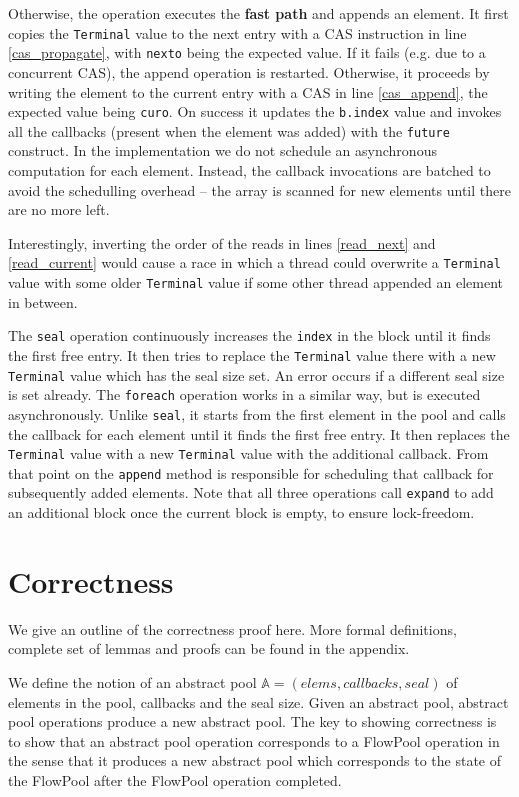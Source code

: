 \documentclass[runningheads,a4paper]{llncs}
\begin{document}
Otherwise, the operation executes the \textbf{fast path} and appends
an element.
It first copies the \verb=Terminal= value to the next entry with a CAS
instruction in line \ref{cas_propagate}, with \verb=nexto= being the
expected value. If it fails (e.g. due to a concurrent CAS), the append
operation is restarted.
Otherwise, it proceeds by writing the element to the current entry with
a CAS in line \ref{cas_append}, the expected value being
\verb=curo=.
On success it updates the \verb=b.index= value and invokes all
the callbacks (present when the element was added) with
the \verb=future= construct.
In the implementation we do not schedule an asynchronous
computation for each element.
Instead, the callback invocations are batched to avoid the schedulling overhead
-- the array is scanned for new elements
until there are no more left.

Interestingly, inverting the order of the reads in lines
\ref{read_next} and \ref{read_current} would cause a race in which a
thread could overwrite a \verb=Terminal= value with some older
\verb=Terminal= value if some other thread appended an element in between.

The \verb=seal= operation continuously increases the \verb=index= in the block
until it finds the first free entry. It then tries to replace the \verb=Terminal=
value there with a new \verb=Terminal= value which has the seal size set.
An error occurs if a different seal size is set already. The \verb=foreach=
operation works in a similar way, but is executed asynchronously. Unlike
\verb=seal=, it starts from the first element in the pool and calls the
callback for each element until it finds the first free entry.
It then replaces the \verb=Terminal= value with a new \verb=Terminal=
value with the additional callback. From that point on the \verb=append=
method is responsible for scheduling that callback for subsequently added elements.
Note that all three operations call \verb=expand= to add an additional
block once the current block is empty, to ensure lock-freedom.



\section{Correctness}

We give an outline of the correctness proof here. More formal
definitions, complete set of lemmas and proofs can be found in the
appendix.

We define the notion of an abstract pool $\mathbb{A} = (elems,
callbacks, seal)$ of elements in the pool, callbacks and the seal
size.
Given an abstract pool, abstract pool operations produce a new
abstract pool.
The key to showing correctness is to show that an abstract pool operation
corresponds to a FlowPool operation in the sense that it produces a
new abstract pool which corresponds to the state of the FlowPool after
the FlowPool operation completed.
\end{document}
